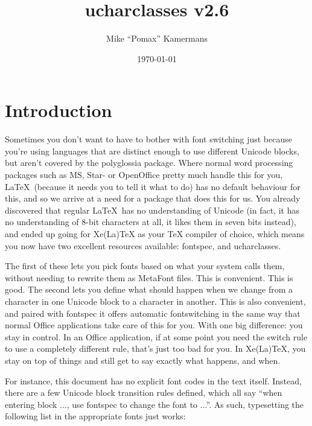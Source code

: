 \documentclass{article}
\begin{document}
  \title{ucharclasses v2.6}
  \author{Mike “Pomax” Kamermans}
  \date{\today}
  \maketitle

  \tableofcontents

  \pagebreak

  \section{Introduction}

    Sometimes you don't want to have to bother with font switching just because you're using languages that are distinct enough to use different Unicode blocks, but aren't covered by the polyglossia package. Where normal word processing packages such as MS, Star- or OpenOffice pretty much handle this for you, \LaTeX\ (because it needs you to tell it what to do) has no default behaviour for this, and so we arrive at a need for a package that does this for us. You already discovered that regular \LaTeX\ has no understanding of Unicode (in fact, it has no understanding of 8-bit characters at all, it likes them in seven bits instead), and ended up going for Xe(La)TeX as your TeX compiler of choice, which means you now have two excellent resources available: fontspec, and ucharclasses.

    The first of these lets you pick fonts based on what your system calls them, without needing to rewrite them as MetaFont files. This is convenient. This is good. The second lets you define what should happen when we change from a character in one Unicode block to a character in another. This is also convenient, and paired with fontspec it offers automatic fontswitching in the same way that normal Office applications take care of this for you. With one big difference: you stay in control. In an Office application, if at some point you need the switch rule to use a completely different rule, that's just too bad for you. In Xe(La)TeX, you stay on top of things and still get to say exactly what happens, and when.

    For instance, this document has no explicit font codes in the text itself. Instead, there are a few Unicode block transition rules defined, which all say “when entering block ..., use fontspec to change the font to ...”. As such, typesetting the following list in the appropriate fonts just works:
\end{document}
